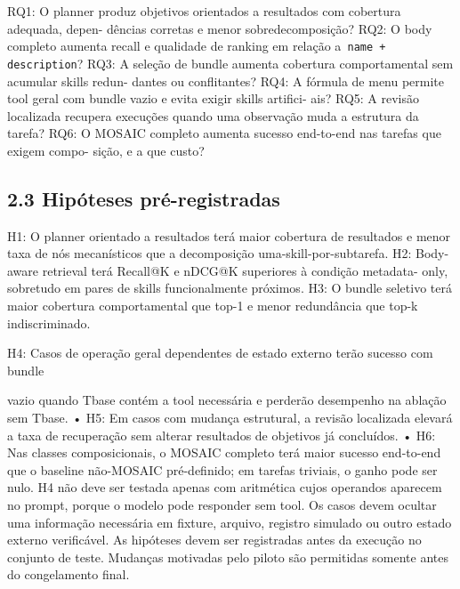 \documentclass[12pt,a4paper]{article}
\begin{document}
\noindent \textbullet{} RQ1: O planner produz objetivos orientados a resultados com cobertura adequada, depen- dências corretas e menor sobredecomposição? \textbullet{} RQ2: O body completo aumenta recall e qualidade de ranking em relação a\texttt{ name +} \texttt{description}? \textbullet{} RQ3: A seleção de bundle aumenta cobertura comportamental sem acumular skills redun- dantes ou conflitantes? \textbullet{} RQ4: A fórmula de menu permite tool geral com bundle vazio e evita exigir skills artifici- ais? \textbullet{} RQ5: A revisão localizada recupera execuções quando uma observação muda a estrutura da tarefa? \textbullet{} RQ6: O MOSAIC completo aumenta sucesso end-to-end nas tarefas que exigem compo- sição, e a que custo?\par

\subsection*{2.3 Hipóteses pré-registradas}

\noindent \textbullet{} H1: O planner orientado a resultados terá maior cobertura de resultados e menor taxa de nós mecanísticos que a decomposição uma-skill-por-subtarefa. \textbullet{} H2: Body-aware retrieval terá Recall@K e nDCG@K superiores à condição metadata- only, sobretudo em pares de skills funcionalmente próximos. \textbullet{} H3: O bundle seletivo terá maior cobertura comportamental que top-1 e menor redundância que top-k indiscriminado.\par


\noindent \textbullet{} H4: Casos de operação geral dependentes de estado externo terão sucesso com bundle\par

vazio quando Tbase contém a tool necessária e perderão desempenho na ablação sem Tbase. • H5: Em casos com mudança estrutural, a revisão localizada elevará a taxa de recuperação sem alterar resultados de objetivos já concluídos. • H6: Nas classes composicionais, o MOSAIC completo terá maior sucesso end-to-end que o baseline não-MOSAIC pré-definido; em tarefas triviais, o ganho pode ser nulo. H4 não deve ser testada apenas com aritmética cujos operandos aparecem no prompt, porque o modelo pode responder sem tool. Os casos devem ocultar uma informação necessária em fixture, arquivo, registro simulado ou outro estado externo verificável. As hipóteses devem ser registradas antes da execução no conjunto de teste. Mudanças motivadas pelo piloto são permitidas somente antes do congelamento final.
\end{document}

